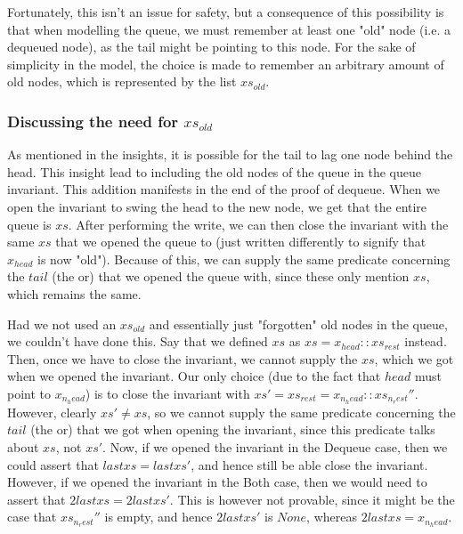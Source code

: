 \documentclass[twoside,11pt,openright]{report}
\begin{document}
Fortunately, this isn't an issue for safety, but a consequence of this possibility is that when modelling the queue, we must remember at least one "old" node (i.e. a dequeued node), as the tail might be pointing to this node. For the sake of simplicity in the model, the choice is made to remember an arbitrary amount of old nodes, which is represented by the list $xs_{old}$.


\subsubsection{Discussing the need for $xs_{old}$}\label{MSQTL:Discussion:xs_old}

As mentioned in the insights, it is possible for the tail to lag one node behind the head. This insight lead to including the old nodes of the queue in the queue invariant. This addition manifests in the end of the proof of dequeue. When we open the invariant to swing the head to the new node, we get that the entire queue is $xs$. After performing the write, we can then close the invariant with the same $xs$ that we opened the queue to (just written differently to signify that $x_{head}$ is now "old"). Because of this, we can supply the same predicate concerning the $tail$ (the or) that we opened the queue with, since these only mention $xs$, which remains the same.

Had we not used an $xs_{old}$ and essentially just "forgotten" old nodes in the queue, we couldn't have done this. Say that we defined $xs$ as $xs = x_{head} :: xs_{rest}$ instead. Then, once we have to close the invariant, we cannot supply the $xs$, which we got when we opened the invariant. Our only choice (due to the fact that $head$ must point to $x_{n_head}$) is to close the invariant with $xs' = xs_{rest} = x_{n_head} :: xs_{n_rest}''$. However, clearly $xs' \neq xs$, so we cannot supply the same predicate concerning the $tail$ (the or) that we got when opening the invariant, since this predicate talks about $xs$, not $xs'$. Now, if we opened the invariant in the Dequeue case, then we could assert that $last xs = last xs'$, and hence still be able close the invariant. However, if we opened the invariant in the Both case, then we would need to assert that $2last xs = 2last xs'$. This is however not provable, since it might be the case that $xs_{n_rest}''$ is empty, and hence $2last xs'$ is $None$, whereas $2last xs = x_{n_head}$.


\end{document}
